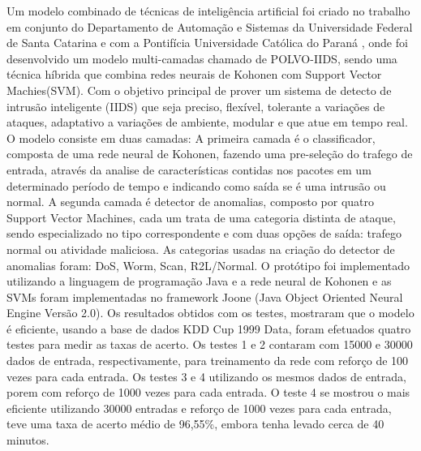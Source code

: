 Um modelo combinado de técnicas de inteligência artificial foi criado no trabalho em conjunto do Departamento de Automação e Sistemas da Universidade Federal de Santa Catarina \cite{polvo1} e com a Pontifícia Universidade Católica do Paraná \cite{polvo2}, onde foi desenvolvido um modelo multi-camadas chamado de POLVO-IIDS, sendo uma técnica híbrida que combina redes neurais de Kohonen com Support Vector Machies(SVM). Com o objetivo principal de prover um sistema de detecto de intrusão inteligente (IIDS) que seja preciso, flexível, tolerante a variações de ataques, adaptativo a variações de ambiente, modular e que atue em tempo real.
O modelo consiste em duas camadas: 
A primeira camada é o classificador, composta de uma rede neural de Kohonen, fazendo uma pre-seleção do trafego de entrada, através da analise de características contidas nos pacotes em um determinado período de tempo e indicando como saída se é uma intrusão ou normal.
A segunda camada é detector de anomalias, composto por quatro Support Vector Machines, cada um trata de uma categoria distinta de ataque, sendo especializado no tipo correspondente e com duas opções de saída: trafego normal ou atividade maliciosa. As categorias usadas na criação do detector de anomalias foram: DoS, Worm, Scan, R2L/Normal.
O protótipo foi implementado utilizando a linguagem de programação Java e a rede neural de Kohonen e as SVMs foram implementadas no framework Joone (Java Object Oriented Neural Engine Versão 2.0).
Os resultados obtidos com os testes, mostraram que o modelo é eficiente, usando a base de dados KDD Cup 1999 Data\cite{KDDCup99}, foram efetuados quatro testes para medir as taxas de acerto. Os testes 1 e 2 contaram com 15000 e 30000 dados de entrada, respectivamente, para treinamento da rede com reforço de 100 vezes para cada entrada. Os testes 3 e 4 utilizando os mesmos dados de entrada, porem com reforço de 1000 vezes para cada entrada. O teste 4 se mostrou o mais eficiente utilizando 30000 entradas e reforço de 1000 vezes para cada entrada, teve uma taxa de acerto médio de 96,55\%, embora tenha levado cerca de 40 minutos.

